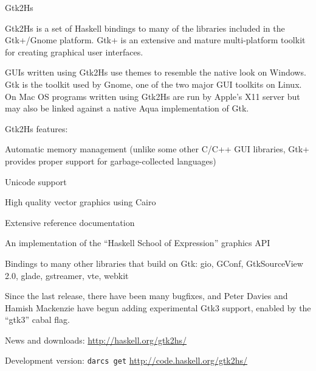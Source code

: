\begin{hcarentry}{Gtk2Hs}
\label{gtk2hs}
\makeheader

Gtk2Hs is a set of Haskell bindings to many of the libraries included
in the Gtk+/Gnome platform. Gtk+ is an extensive and mature
multi-platform toolkit for creating graphical user interfaces.

GUIs written using Gtk2Hs use themes to resemble the native look on
Windows. Gtk is the toolkit used by Gnome, one of the two major GUI toolkits
on Linux. On Mac OS programs written using Gtk2Hs are run by Apple's
X11 server but may also be linked against a native Aqua implementation
of Gtk.

\Separate
Gtk2Hs features:
\begin{compactitem}
\item Automatic memory management (unlike some other C/C++ GUI
libraries, Gtk+ provides proper support for garbage-collected languages)
\item Unicode support
\item High quality vector graphics using Cairo
\item Extensive reference documentation
\item An implementation of the ``Haskell School of Expression'' graphics
API
\item Bindings to many other libraries that build on Gtk: gio, GConf,
  GtkSourceView 2.0, glade, gstreamer, vte, webkit
\end{compactitem}

\Separate

Since the last release, there have been many bugfixes, and Peter Davies and
Hamish Mackenzie have begun adding experimental Gtk3 support, enabled by the
``gtk3'' cabal flag.

\FurtherReading
\begin{compactitem}
\item News and downloads:
  \url{http://haskell.org/gtk2hs/}

\item Development version:
  \texttt{darcs get} \url{http://code.haskell.org/gtk2hs/}
\end{compactitem}
\end{hcarentry} 
